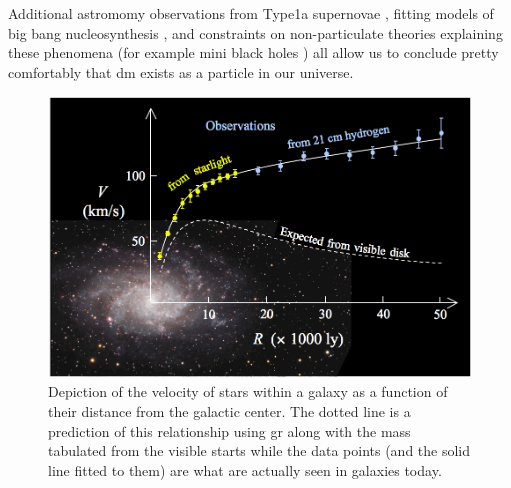 Additional astromomy observations from Type1a supernovae \cite{type1a-supernova-2010}, fitting
models of big bang nucleosynthesis \cite{nucleosynthesis-1998}, and constraints on non-particulate
theories explaining these phenomena (for example mini black holes
\cite{constraints-primordial-black-holes-2021}) all allow us to conclude pretty comfortably that
\ac{dm} exists as a particle in our universe.

\begin{figure}
  \centering
  \includegraphics[width=\textwidth]{figures/theory/rotation-curve-evidence-for-dm.png}
  \caption{
    Depiction of the velocity of stars within a galaxy as a function of their distance
    from the galactic center. The dotted line is a prediction of this relationship using
    \ac{gr} along with the mass tabulated from the visible starts while the data points
    (and the solid line fitted to them) are what are actually seen in galaxies today.
  }
  \label{fig:rotation-curve}
\end{figure}

